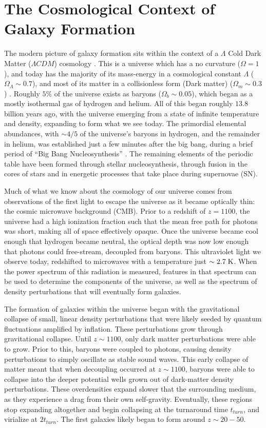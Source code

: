 \section{The Cosmological Context of Galaxy Formation}
The modern picture of galaxy formation sits within the context of a $\Lambda$
Cold Dark Matter  ($\Lambda CDM$) cosmology \citet{White1978,Mo1998}.  This is a
universe which has a no curvature ($\Omega = 1$), and today has the majority of
its mass-energy in a cosmological constant $\Lambda$ ($\Omega_\Lambda \sim
0.7$), and most of its matter in a collisionless form (Dark matter) ($\Omega_m
\sim 0.3$) \citep{Planck2014}.  Roughly $5\%$ of the universe exists as baryons ($\Omega_b \sim
0.05$), which began as a mostly isothermal gas of hydrogen and helium.  All of
this began roughly $13.8$ billion years ago, with the universe emerging from a
state of infinite temperature and density, expanding to form what we see today.
The primordial elemental abundances, with $\sim4/5$ of the universe's baryons in
hydrogen, and the remainder in helium, was established just a few minutes after
the big bang, during a brief period of ``Big Bang Nucleosynthesis''
\citep{Alpher1948}.  The remaining elements of the periodic table have been
formed through stellar nucleosynthesis, through fusion in the cores of stars and
in energetic processes that take place during supernovae (SN)\citet{Wagoner1967}.

Much of what we know about the cosmology of our universe comes from observations
of the first light to escape the universe as it became optically thin: the
cosmic microwave background (CMB).  Prior to a redshift of $z=1100$, the
universe had a high ionization fraction such that the mean free path for
photons was short, making all of space effectively opaque.  Once the universe
became cool enough that hydrogen became neutral, the optical depth was now low
enough that photons could free-stream, decoupled from baryons.  This ultraviolet
light we observe today, redshifted to microwaves with a temperature just
$\sim2.7\;\rm{K}$.  When the power spectrum of this radiation is measured,
features in that spectrum can be used to determine the components of the
universe, as well as the spectrum of density perturbations that will eventually
form galaxies.

The formation of galaxies within the universe began with the gravitational
collapse of small, linear density perturbations that were likely seeded by
quantum fluctuations amplified by inflation.  These perturbations grow through
gravitational collapse.  Until $z\sim1100$, only dark matter perturbations were
able to grow.  Prior to this, baryons were coupled to photons, causing density
perturbations to simply oscillate as stable sound waves.  This early collapse of
matter meant that when decoupling occurred at $z\sim1100$, baryons were able to
collapse into the deeper potential wells grown out of dark-matter density
perturbations.  These overdensities expand slower that the surrounding medium,
as they experience a drag from their own self-gravity.  Eventually, these
regions stop expanding altogether and begin collapsing at the turnaround time
$t_{turn}$, and virialize at $2t_{turn}$. The first galaxies likely began to
form around $z\sim20-50$.


